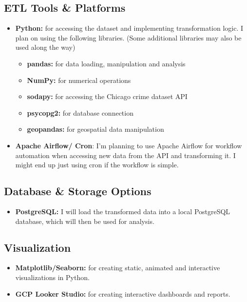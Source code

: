 \documentclass{article}
\begin{document}
\subsection{ETL Tools \& Platforms}
\begin{itemize}[leftmargin=2em]
    \item \textbf{Python:} for accessing the dataset and implementing transformation logic. I plan on using the following libraries. (Some additional libraries may also be used along the way) 
    \begin{itemize}[leftmargin=2em]
        \item \textbf{pandas:} for data loading, manipulation and analysis
        \item \textbf{NumPy:} for numerical operations
        \item \textbf{sodapy:} for accessing the Chicago crime dataset API
        \item \textbf{psycopg2:} for database connection
        \item \textbf{geopandas:} for geospatial data manipulation
    \end{itemize}
    \item \textbf{Apache Airflow/ Cron}: I'm planning to use Apache Airflow for workflow automation when accessing new data from the API and transforming it. I might end up just using cron if the workflow is simple.
\end{itemize}

\subsection{Database \& Storage Options}
\begin{itemize}[leftmargin=2em]
    \item \textbf{PostgreSQL:} I will load the transformed data into a local PostgreSQL database, which will then be used for analysis. 
\end{itemize}

\subsection{Visualization}
\begin{itemize}
    \item \textbf{Matplotlib/Seaborn:} for creating static, animated and interactive visualizations in Python.
    \item \textbf{GCP Looker Studio:} for creating interactive dashboards and reports.
\end{itemize}
\end{document}
